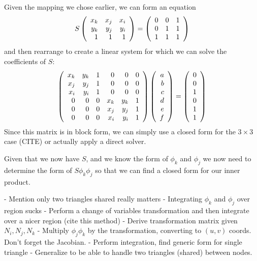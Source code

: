Given the mapping we chose earlier, we can form an equation
\begin{equation}
S \left(\begin{array}{rrrrrr}  x_k & x_j & x_i \\ y_k & y_j & y_i \\ 1 & 1 & 1 \\ \end{array} \right)
=
\left(\begin{array}{rrrrrr}  0 & 0 & 1 \\ 0 & 1 & 1 \\ 1 & 1 & 1  \\ \end{array} \right)
\end{equation}
and then rearrange to create a linear system for which we can solve the coefficients of $S$:
\begin{equation}
\left(\begin{array}{rrrrrr} 
    x_k & y_k & 1 & 0 & 0 & 0 \\
    x_j & y_j & 1 & 0 & 0 & 0 \\
    x_i & y_i & 1 & 0 & 0 & 0 \\
    0 & 0 & 0 & x_k & y_k & 1 \\
    0 & 0 & 0 & x_j & y_j & 1 \\
    0 & 0 & 0 & x_i & y_i & 1
 \\ \end{array} \right)
\left(\begin{array}{rrrrrr} a \\ b \\ c \\ d \\ e \\ f \\ \end{array} \right)
=
\left(\begin{array}{rrrrrr} 0 \\ 0 \\ 1 \\ 0 \\ 1 \\ 1 \\ \end{array} \right)
\end{equation}
Since this matrix is in block form, we can simply use a closed form for the $3 \times 3$ case (CITE) or
actually apply a direct solver.

Given that we now have $S$, and we know the form of $\phi_k$ and $\phi_j$ we now need to determine the form of
$S\phi_k \phi_j$ so that we can find a closed form for our inner product.

- Mention only two triangles shared really matters
- Integrating $\phi_k$ and $\phi_j$ over region sucks
- Perform a change of variables transformation and then integrate over a nicer region (cite this method)
    - Derive transformation matrix given $N_i, N_j, N_k$
    - Multiply $\phi_j \phi_k$ by the transformation, converting to $(u,v)$ coords. Don't forget the Jacobian.
    - Perform integration, find generic form for single triangle
    - Generalize to be able to handle two triangles (shared) between nodes.
